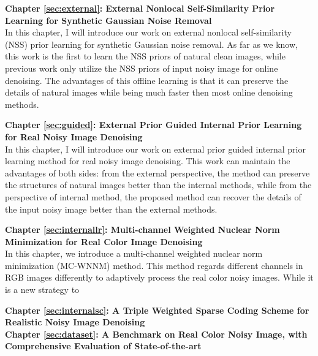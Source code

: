 \textbf{Chapter \ref{sec:external}: External Nonlocal Self-Similarity Prior Learning for Synthetic Gaussian Noise Removal} \\[0.2em]

In this chapter, I will introduce our work on external nonlocal self-similarity (NSS) prior learning for synthetic Gaussian noise removal. As far as we know, this work is the first to learn the NSS priors of natural clean images, while previous work only utilize the NSS priors of input noisy image for online denoising. The advantages of this offline learning is that it can preserve the details of natural images while being much faster then most online denoising methods.


\textbf{Chapter \ref{sec:guided}: External Prior Guided Internal Prior Learning for Real Noisy Image Denoising} \\[0.2em]

In this chapter, I will introduce our work on external prior guided internal prior learning method for real noisy image denoising. This work can maintain the advantages of both sides: from the external perspective, the method can preserve the structures of natural images better than the internal methods, while from the perspective of internal method, the proposed method can recover the details of the input noisy image better than the external methods.



\textbf{Chapter \ref{sec:internallr}: Multi-channel Weighted Nuclear Norm Minimization for Real Color Image Denoising} \\[0.2em]

In this chapter, we introduce a multi-channel weighted nuclear norm minimization (MC-WNNM) method. This method regards different channels in RGB images differently to adaptively process the real color noisy images. While it is a new strategy to 



\textbf{Chapter \ref{sec:internalsc}: A Triple Weighted Sparse Coding Scheme for Realistic Noisy Image Denoising} \\[0.2em]




\textbf{Chapter \ref{sec:dataset}: A Benchmark on Real Color Noisy Image, with Comprehensive Evaluation of State-of-the-art} \\[0.2em]



